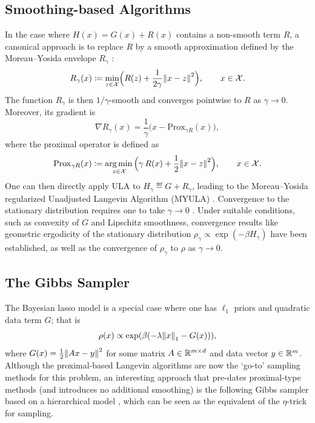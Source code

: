 \documentclass[11pt, twoside]{report}
\begin{document}
\subsection{Smoothing-based Algorithms}
In the case where $H(x) = G(x) + R(x)$ contains a non-smooth term $R$, a canonical approach is to replace $R$ by a smooth approximation defined by the Moreau--Yosida envelope $R_\gamma$ \cite{pereyra2016proximal}:
$$
R_\gamma(x)\eqdef \min_{z\in \mathcal X} \Bigl(R(z) + \frac{1}{2\gamma}\norm{x-z}^2\Bigr),\qquad x\in \mathcal X.
$$
The function $R_\gamma$ is then $1/\gamma$-smooth and converges pointwise to $R$ as $\gamma \to 0$. 
Moreover, its gradient is
$$
\nabla R_\gamma(x) = \frac{1}{\gamma}\bigl( x - \mathrm{Prox}_{\gamma R}(x)\bigr),
$$
where the proximal operator is defined as
\begin{align*}
    \mathrm{Prox}_{\gamma R}(x) \eqdef \argmin_{z\in \mathcal X} \Bigl(\gamma\, R(x) + \frac12 \norm{x-z}^2\Bigr),\qquad x\in \mathcal X.
\end{align*}
One can then directly apply ULA to $H_\gamma\eqdef G + R_\gamma$, leading to the Moreau--Yosida regularized Unadjusted Langevin Algorithm (MYULA) \cite{durmus2018efficient}. Convergence to the stationary distribution requires one to take $\gamma \to 0$ \cite{durmus2018efficient}. Under suitable conditions, such as convexity of $G$ and Lipschitz smoothness, convergence results like geometric ergodicity of the stationary distribution   $\rho_\gamma \propto \exp(-\beta H_\gamma)$ have been established, as well as the convergence of $\rho_\gamma$ to $\rho$ as $\gamma \to 0$.
\subsection{The Gibbs Sampler}
The Bayesian lasso model is a special case where one has $\ell_1$ priors and quadratic data term $G$; that is
$$
\rho(x) \propto \exp\pa{ \beta \pa{-\lambda \norm{x}_1 - G(x)} },
$$
where $G(x) = \frac12\norm{Ax-y}^2$
for some matrix $A\in \mathbb{R}^{m\times d}$ and data vector $y\in \mathbb{R}^m$. 
Although the proximal-based Langevin algorithms are now the `go-to' sampling methods for this problem,  an interesting approach that  pre-dates  proximal-type methods (and introduces no additional smoothing) is the following Gibbs sampler based on a hierarchical model \cite{park2008bayesian}, which can be seen as the equivalent of the $\eta$-trick for sampling.

\end{document}
